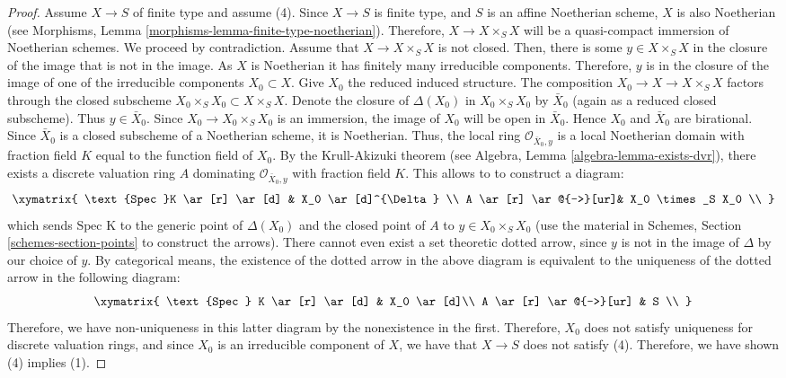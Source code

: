 \begin{proof}
\medskip\noindent
Assume $X \to S$ of finite type and assume (4).
Since $X \to S$ is finite type, and $S$ is an affine Noetherian
scheme, $X$ is also Noetherian (see
Morphisms, Lemma \ref{morphisms-lemma-finite-type-noetherian}).
Therefore, $X \to X \times_S X$ will
be a quasi-compact immersion of Noetherian schemes.  We proceed by
contradiction.  Assume that $X \to X \times_S X$ is not closed.  Then,
there is some $y \in X \times_S X$ in the closure of the image that is
not in the image. As $X$ is Noetherian it has finitely many irreducible
components. Therefore, $y$ is in the closure of the image of one of
the irreducible components $X_0 \subset X$.  Give $X_0$ the reduced
induced structure.  The composition $X_0 \to X \to X \times_S X$
factors through the closed subscheme $X_0 \times_S X_0 \subset X \times_S X$.
Denote the closure of $\Delta(X_0)$ in $X_0 \times_S X_0$
by $\bar X_0$ (again as a reduced closed subscheme). Thus $y \in \bar X_0$.
Since $X_0 \to X_0 \times_S X_0$ is an immersion, the image of $X_0$
will be open in $\bar X_0$. Hence $X_0$ and $\bar X_0$ are
birational. Since $\bar{X}_0$ is a closed subscheme of a
Noetherian scheme, it is Noetherian. Thus, the local ring
$\mathcal O_{{\bar X_0, y}}$ is a local Noetherian domain with fraction
field $K$ equal to the function field of $X_0$.  By the Krull-Akizuki
theorem (see Algebra, Lemma \ref{algebra-lemma-exists-dvr}), there exists a
discrete valuation ring $A$ dominating $\mathcal O_{{\bar X_0, y}}$
with fraction field $K$.  This allows to to construct a diagram:
\begin{equation}
\label{equation-valuative-generic}
\xymatrix{
\text{Spec }K \ar[r] \ar[d] & X_0 \ar[d]^{\Delta} \\
A \ar[r] \ar@{-->}[ur]& X_0 \times_S X_0 \\
}
\end{equation}
which sends $\text{Spec K}$ to the generic point of $\Delta(X_0)$ and
the closed point of $A$ to $y \in X_0 \times_S X_0$ (use the material in
Schemes, Section \ref{schemes-section-points} to construct the arrows).
There cannot even exist
a set theoretic dotted arrow, since $y$ is not in the image of
$\Delta$ by our choice of $y$.  By categorical means, the existence of
the dotted arrow in the above diagram is equivalent to the uniqueness
of the dotted arrow in the following diagram:
\begin{equation}
\label{equation-valuative-nonexistent}
\xymatrix{
\text{Spec } K \ar[r] \ar[d] & X_0 \ar[d]\\
A \ar[r] \ar@{-->}[ur] & S \\
}
\end{equation}
Therefore, we have non-uniqueness in this latter diagram by the
nonexistence in the first.  Therefore, $X_0$ does not satisfy
uniqueness for discrete valuation rings, and since $X_0$ is an
irreducible component of $X$, we have that $X \to S$ does not satisfy
(4).  Therefore, we have shown (4) implies (1).
\end{proof}

